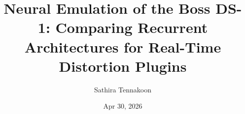 \usepackage[a4paper,margin=1in]{geometry}
\usepackage{amsmath,amssymb}
\usepackage{tikz-cd}
\usepackage{multicol}
\usepackage{graphicx}
\usepackage{booktabs}
\usepackage{longtable}
\usepackage{array}
\usepackage{setspace}
\usepackage[authoryear,round]{natbib}
\usepackage[hidelinks]{hyperref}
\usepackage{url}
\usepackage{tikz}
\usetikzlibrary{positioning}

\setlength{\parindent}{0pt}
\setlength{\parskip}{0.75\baselineskip}
\onehalfspacing

\title{Neural Emulation of the Boss DS-1: Comparing Recurrent Architectures for Real-Time Distortion Plugins}
\author{Sathira Tennakoon}
\date{Apr 30, 2026}
